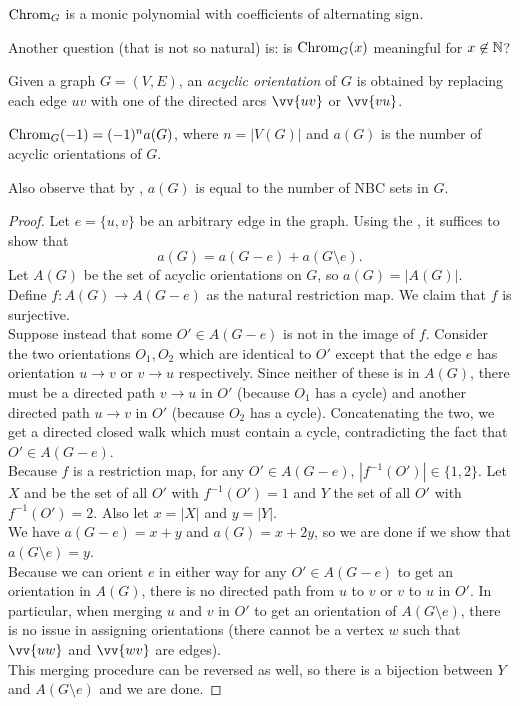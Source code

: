 	\begin{fcor}
		$\operatorname{Chrom}_G$ is a monic polynomial with coefficients of alternating sign.
	\end{fcor}

	Another question (that is not so natural) is: is $\operatorname{Chrom}_G(x)$ meaningful for $x\not\in\mathbb{N}$?

	\begin{fdef}
		Given a graph $G = (V,E)$, an \emph{acyclic orientation} of $G$ is obtained by replacing each edge $uv$ with one of the directed arcs $\vv{uv}$ or $\vv{vu}$.
	\end{fdef}

	\begin{ftheo}
		$\operatorname{Chrom}_G(-1) = (-1)^n a(G)$, where $n = |V(G)|$ and $a(G)$ is the number of acyclic orientations of $G$.
	\end{ftheo}
	Also observe that by , $a(G)$ is equal to the number of NBC sets in $G$.
	\begin{proof}
		Let $e=\{u,v\}$ be an arbitrary edge in the graph. Using the , it suffices to show that
		\[ a(G) = a(G-e) + a(G\setminus e). \]
		Let $A(G)$ be the set of acyclic orientations on $G$, so $a(G) = |A(G)|$.\\
		Define $f : A(G) \to A(G-e)$ as the natural restriction map. We claim that $f$ is surjective.\\
		Suppose instead that some $O' \in A(G-e)$ is not in the image of $f$. Consider the two orientations $O_1,O_2$ which are identical to $O'$ except that the edge $e$ has orientation $u\to v$ or $v\to u$ respectively. Since neither of these is in $A(G)$, there must be a directed path $v \to u$ in $O'$ (because $O_1$ has a cycle) and another directed path $u \to v$ in $O'$ (because $O_2$ has a cycle). Concatenating the two, we get a directed closed walk which must contain a cycle, contradicting the fact that $O' \in A(G-e)$.\\
		
		Because $f$ is a restriction map, for any $O' \in A(G-e)$, $|f^{-1}(O')| \in \{1,2\}$. Let $X$ and be the set of all $O'$ with $f^{-1}(O') = 1$ and $Y$ the set of all $O'$ with $f^{-1}(O') = 2$. Also let $x = |X|$ and $y = |Y|$.\\
		We have $a(G-e) = x+y$ and $a(G) = x+2y$, so we are done if we show that $a(G\setminus e) = y$.\\

		Because we can orient $e$ in either way for any $O' \in A(G-e)$ to get an orientation in $A(G)$, there is no directed path from $u$ to $v$ or $v$ to $u$ in $O'$. In particular, when merging $u$ and $v$ in $O'$ to get an orientation of $A(G\setminus e)$, there is no issue in assigning orientations (there cannot be a vertex $w$ such that $\vv{uw}$ and $\vv{wv}$ are edges).\\
		This merging procedure can be reversed as well, so there is a bijection between $Y$ and $A(G\setminus e)$ and we are done.
	\end{proof}

